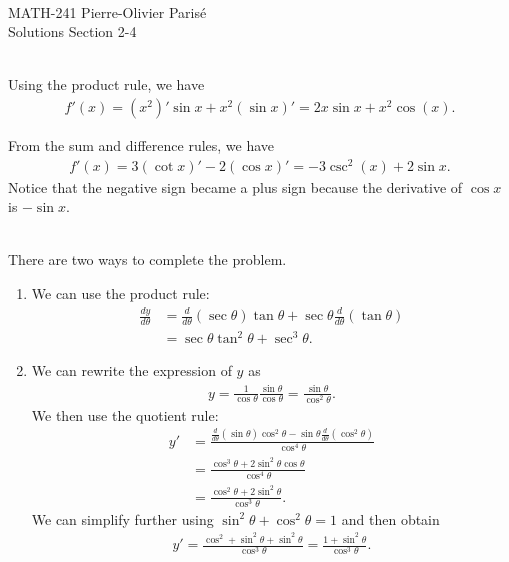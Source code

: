 


	\noindent \hrulefill \\
	MATH-241 \hfill Pierre-Olivier Paris{\'e}\\
	Solutions Section 2-4 \hfill \semester \\\vspace*{-1cm}
	
	\noindent\hrulefill
	
	\spc
	
	\\
	Using the product rule, we have
		\begin{align*}
		f'(x) = (x^2)' \sin x + x^2 (\sin x)' = 2x \sin x + x^2 \cos (x) .
		\end{align*}
		
	\spc
	
	From the sum and difference rules, we have
		\begin{align*}
		f'(x) = 3 (\cot x)' - 2 (\cos x)' = -3 \csc^2 (x) + 2 \sin x .
		\end{align*}
	Notice that the negative sign became a plus sign because the derivative of $\cos x$ is $-\sin x$.
	
	\spc
	
	\\
	There are two ways to complete the problem.
		\begin{enumerate}
		\item We can use the product rule:
			\begin{align*}
			\frac{dy}{d\theta} &= \frac{d}{d\theta} (\sec \theta) \tan \theta + \sec \theta \frac{d}{d\theta} (\tan \theta ) \\
			&= \sec\theta \tan^2 \theta + \sec^3 \theta .
			\end{align*}
		\item We can rewrite the expression of $y$ as
			\begin{align*}
			y = \frac{1}{\cos \theta} \frac{\sin \theta}{\cos \theta} = \frac{\sin \theta}{\cos^2 \theta} .
			\end{align*}
		We then use the quotient rule:
			\begin{align*}
			y' &= \frac{\frac{d}{d\theta} (\sin \theta ) \cos^2 \theta - \sin \theta \frac{d}{d\theta} (\cos^2 \theta )}{\cos^4 \theta} \\
			&= \frac{\cos^3 \theta + 2 \sin^2 \theta \cos \theta}{\cos^4 \theta} \\
			&= \frac{\cos^2 \theta + 2 \sin^2 \theta}{\cos^3 \theta} .
			\end{align*}
		We can simplify further using $\sin^2 \theta + \cos^2 \theta = 1$ and then obtain
			\begin{align*}
			y' = \frac{\cos^2 + \sin^2 \theta + \sin^2 \theta}{\cos^3 \theta} = \frac{1 + \sin^2 \theta}{\cos^3 \theta} .
			\end{align*}
		\end{enumerate}
		
